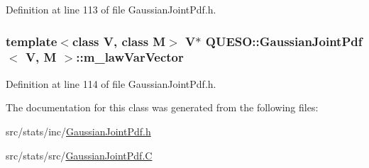 Definition at line 113 of file Gaussian\-Joint\-Pdf.\-h.

\hypertarget{class_q_u_e_s_o_1_1_gaussian_joint_pdf_a35008ff77d5f572a7ee58fef4bfc536d}{
\subsubsection[{m\-\_\-law\-Var\-Vector}]{\setlength{\rightskip}{0pt plus 5cm}template$<$class V, class M$>$ V$\ast$ {\bf Q\-U\-E\-S\-O\-::\-Gaussian\-Joint\-Pdf}$<$ V, M $>$\-::m\-\_\-law\-Var\-Vector\hspace{0.3cm}{\ttfamily [protected]}}}\label{class_q_u_e_s_o_1_1_gaussian_joint_pdf_a35008ff77d5f572a7ee58fef4bfc536d}


Definition at line 114 of file Gaussian\-Joint\-Pdf.\-h.



The documentation for this class was generated from the following files\-:\begin{DoxyCompactItemize}
\item 
src/stats/inc/\hyperlink{_gaussian_joint_pdf_8h}{Gaussian\-Joint\-Pdf.\-h}\item 
src/stats/src/\hyperlink{_gaussian_joint_pdf_8_c}{Gaussian\-Joint\-Pdf.\-C}\end{DoxyCompactItemize}
